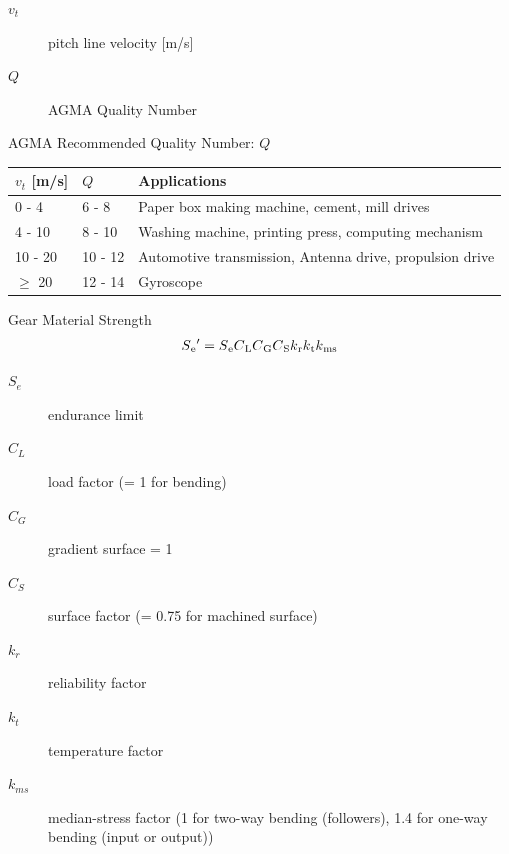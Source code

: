\documentclass[a4paper,openany]{tufte-book}
\begin{document}
\begin{description}
\item[{\(v_{t}\)}] pitch line velocity [m/s]

\item[{\(Q\)}] AGMA Quality Number
\end{description}

AGMA Recommended Quality Number: \(Q\)

\begin{center}
\begin{tabular}{lll}
\(v_{t}\) [m/s] & \(Q\) & Applications\\
\hline
0 - 4 & 6 - 8 & Paper box making machine, cement, mill drives\\
4 - 10 & 8 - 10 & Washing machine, printing press, computing mechanism\\
10 - 20 & 10 - 12 & Automotive transmission, Antenna drive, propulsion drive\\
\(\geqslant\) 20 & 12 - 14 & Gyroscope\\
\end{tabular}
\end{center}

Gear Material Strength \begin{align}
    S\textsubscript{e}\textsuperscript{\(\prime\)} = S\textsubscript{e}C\textsubscript{L}C\textsubscript{G}C\textsubscript{S}k\textsubscript{r}k\textsubscript{t}k\textsubscript{ms}
  \end{align}

\begin{description}
\item[{\(S_{e}\)}] endurance limit

\item[{\(C_{L}\)}] load factor (= 1 for bending)

\item[{\(C_{G}\)}] gradient surface = 1

\item[{\(C_{S}\)}] surface factor (= 0.75 for machined surface)

\item[{\(k_{r}\)}] reliability factor

\item[{\(k_{t}\)}] temperature factor

\item[{\(k_{ms}\)}] median-stress factor (1 for two-way bending (followers),
1.4 for one-way bending (input or output))
\end{description}
\end{document}
